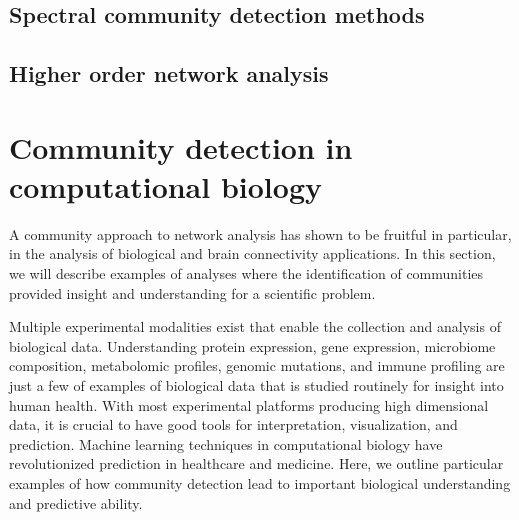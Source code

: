 \subsection{Spectral community detection methods}

\subsection{Higher order network analysis}

\section{Community detection in computational biology}
 A community approach to network analysis has shown to be fruitful in particular, in the analysis of biological and brain connectivity applications. In this section, we will describe examples of analyses where the identification of communities provided insight and understanding for a scientific problem. 

Multiple experimental modalities exist that enable the collection and analysis of biological data. Understanding protein expression, gene expression, microbiome composition, metabolomic profiles, genomic mutations, and immune profiling are just a few of examples of biological data that is studied routinely for insight into human health. With most experimental platforms producing high dimensional data, it is crucial to have good tools for interpretation, visualization, and prediction. Machine learning techniques in computational biology have revolutionized prediction in healthcare and medicine. Here, we outline particular examples of how community detection lead to important biological understanding and predictive ability.

